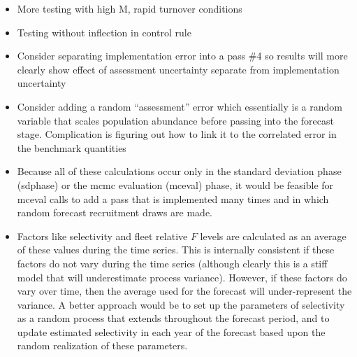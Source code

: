 \begin{itemize}
	\item More testing with high M, rapid turnover conditions
	\item Testing without inflection in control rule
	\item Consider separating implementation error into a pass \#4 so results will more clearly show effect of assessment uncertainty separate from implementation uncertainty
	\item Consider adding a random ``assessment'' error which essentially is a random variable that scales population abundance before passing into the forecast stage. Complication is figuring out how to link it to the correlated error in the benchmark quantities
	\item Because all of these calculations occur only in the standard deviation phase (sdphase) or the \gls{mcmc} evaluation (mceval) phase, it would be feasible for mceval calls to add a pass that is implemented many times and in which random forecast recruitment draws are made.
	\item Factors like selectivity and fleet relative $F$ levels are calculated as an average of these values during the time series. This is internally consistent if these factors do not vary during the time series (although clearly this is a stiff model that will underestimate process variance). However, if these factors do vary over time, then the average used for the forecast will under-represent the variance. A better approach would be to set up the parameters of selectivity as a random process that extends throughout the forecast period, and to update estimated selectivity in each year of the forecast based upon the random realization of these parameters.
\end{itemize}

	
